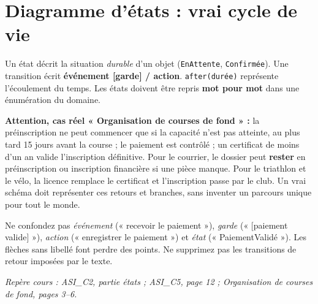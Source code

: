 \documentclass[10pt,a4paper]{article}
\newcommand{\source}[1]{\par{\footnotesize\color{bodygray}\textit{Repère cours : #1}}}
\begin{document}
\section{Diagramme d'états : vrai cycle de vie}
Un état décrit la situation \emph{durable} d'un objet (\texttt{EnAttente}, \texttt{Confirmée}). Une transition écrit \textbf{événement [garde] / action}. \texttt{after(durée)} représente l'écoulement du temps. Les états doivent être repris \textbf{mot pour mot} dans une énumération du domaine.
\begin{center}
\end{center}
\textbf{Attention, cas réel « Organisation de courses de fond » :} la préinscription ne peut commencer que si la capacité n'est pas atteinte, au plus tard 15 jours avant la course ; le paiement est contrôlé ; un certificat de moins d'un an valide l'inscription définitive. Pour le courrier, le dossier peut \textbf{rester} en préinscription ou inscription financière si une pièce manque. Pour le triathlon et le vélo, la licence remplace le certificat et l'inscription passe par le club. Un vrai schéma doit représenter ces retours et branches, sans inventer un parcours unique pour tout le monde.
\begin{warningbox}
Ne confondez pas \emph{événement} (« recevoir le paiement »), \emph{garde} (« [paiement valide] »), \emph{action} (« enregistrer le paiement ») et \emph{état} (« PaiementValidé »). Les flèches sans libellé font perdre des points. Ne supprimez pas les transitions de retour imposées par le texte.
\end{warningbox}
\source{ASI\_C2, partie états ; ASI\_C5, page 12 ; Organisation de courses de fond, pages 3--6.}
\end{document}
